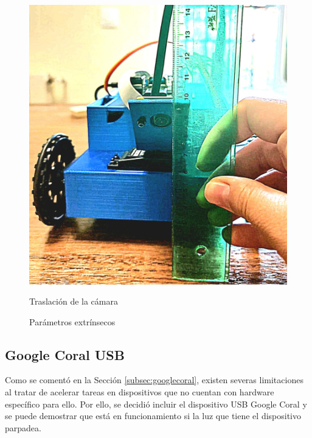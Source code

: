 \begin{figure}[ht!]
\begin{minipage}{0.35\linewidth}
		\includegraphics[width=\linewidth]{figs/cap6/traslacion.jpeg}
		\caption*{\centering Traslación de la cámara} 
	\end{minipage}
	\caption{Parámetros extrínsecos}
	\label{fig:extrinseco}
\end{figure}


\subsection{Google Coral USB}
\label{subsec:configgcoral}

Como se comentó en la Sección \ref{subsec:googlecoral}, existen severas limitaciones al tratar de acelerar tareas en dispositivos que no cuentan con hardware específico para ello. Por ello, se decidió incluir el dispositivo USB Google Coral y se puede demostrar que está en funcionamiento si la luz que tiene el dispositivo parpadea. 




